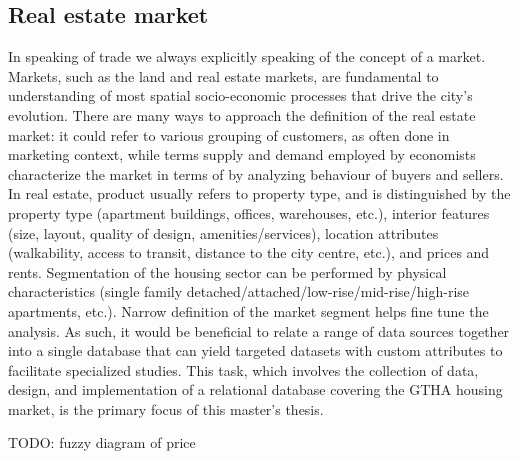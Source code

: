 \subsection{Real estate market} \label{subsec:real_estate_market}

In speaking of trade we always explicitly speaking of the concept of a market.
Markets, such as the land and real estate markets, are fundamental to understanding of most spatial socio-economic processes that drive the city's evolution.
There are many ways to approach the definition of the real estate market\cite{Brett2009}: it could refer to various grouping of customers, as often done in marketing context, while terms supply and demand employed by economists characterize the market in terms of by analyzing behaviour of buyers and sellers.
In real estate, product usually refers to property type, and is distinguished by the property type (apartment buildings, offices, warehouses, etc.), interior features (size, layout, quality of design, amenities/services), location attributes (walkability, access to transit, distance to the city centre, etc.), and prices and rents.
Segmentation of the housing sector can be performed by physical characteristics (single family detached/attached/low-rise/mid-rise/high-rise apartments, etc.).
Narrow definition of the market segment helps fine tune the analysis.
As such, it would be beneficial to relate a range of data sources together into a single database that can yield targeted datasets with custom attributes to facilitate specialized studies.
This task, which involves the collection of data, design, and implementation of a relational database covering the GTHA housing market, is the primary focus of this master's thesis.

TODO: fuzzy diagram of price

